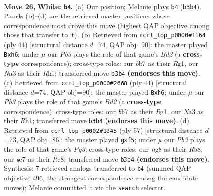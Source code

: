 \documentclass[11pt]{article}
\begin{document}
\clearpage

\begin{figure}[p]\centering
\begin{subfigure}{0.46\textwidth}\centering
\resizebox{\linewidth}{!}{%
\newchessgame
\chessboard[
  setfen={r2k2nr/1b2q3/8/2p1Pp2/p2p1Q1p/NP5P/P3B1P1/2R3KR w - - 0 26},
  showmover=false,
  pgfstyle=straightmove, color=movearrow, markmove={b3-b4}
]}
\caption{}
\end{subfigure}\hfill
\begin{subfigure}{0.46\textwidth}\centering
\resizebox{\linewidth}{!}{%
\newchessgame
\chessboard[
  setfen={r4rk1/pp4p1/1q2pb1p/7P/2p1Q3/1P6/P1PB1P2/1K4RR w - - 0 23},
  showmover=false,
  pgfstyle=straightmove, color=movearrow, markmove={d2-h6}
]}
\caption{}
\end{subfigure}
\\[4pt]
\begin{subfigure}{0.46\textwidth}\centering
\resizebox{\linewidth}{!}{%
\newchessgame
\chessboard[
  setfen={r4rk1/pp4p1/1q2pb1p/7P/2p1Q3/1P6/P1PB1P2/1K4RR w - - 0 23},
  showmover=false,
  pgfstyle=straightmove, color=movearrow, markmove={d2-h6}
]}
\caption{}
\end{subfigure}\hfill
\begin{subfigure}{0.46\textwidth}\centering
\resizebox{\linewidth}{!}{%
\newchessgame
\chessboard[
  setfen={1rrn4/4q1kp/pp2P1p1/4pP2/1PP5/5BP1/7P/1RRQ2K1 b - - 0 29},
  showmover=false,
  pgfstyle=straightmove, color=movearrow, markmove={g6-f5}
]}
\caption{}
\end{subfigure}
\caption{\textbf{Move 26, White: \texttt{b4}.} (a) Our position; Melanie plays \texttt{b4} (\texttt{b3b4}). Panels (b)--(d) are the retrieved master positions whose correspondence most drove this move (highest QAP objective among those that transfer to it). (b) Retrieved from \texttt{ccrl\_top\_p0000\#1164} (ply 44) [structural distance $d$=74, QAP obj=90]: the master played \texttt{Bxh6}; under $\mu$ our \emph{Pb3} plays the role of that game's \emph{Bd2} (a \textbf{cross-type} correspondence); cross-type roles: our \emph{b}b7 as their \emph{R}g1, our \emph{N}a3 as their \emph{R}h1; transferred move \texttt{b3b4} \textbf{(endorses this move)}. (c) Retrieved from \texttt{ccrl\_top\_p0000\#2668} (ply 44) [structural distance $d$=74, QAP obj=90]: the master played \texttt{Bxh6}; under $\mu$ our \emph{Pb3} plays the role of that game's \emph{Bd2} (a \textbf{cross-type} correspondence); cross-type roles: our \emph{b}b7 as their \emph{R}g1, our \emph{N}a3 as their \emph{R}h1; transferred move \texttt{b3b4} \textbf{(endorses this move)}. (d) Retrieved from \texttt{ccrl\_top\_p0002\#1845} (ply 57) [structural distance $d$=73, QAP obj=86]: the master played \texttt{gxf5}; under $\mu$ our \emph{Pb3} plays the role of that game's \emph{Pg3}; cross-type roles: our \emph{n}g8 as their \emph{R}b8, our \emph{q}e7 as their \emph{R}c8; transferred move \texttt{b3b4} \textbf{(endorses this move)}. Synthesis: 7 retrieved analogs transferred to \texttt{b4} (summed QAP objective 496, the strongest correspondence among the candidate moves); Melanie committed it via the \texttt{search} selector.}
\label{fig:thought-m50}
\end{figure}
\end{document}
